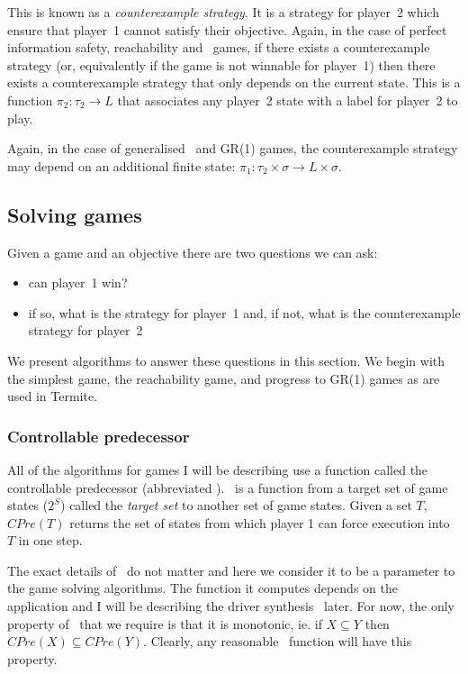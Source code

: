 This is known as a \emph{counterexample strategy}. It is a strategy for player~2 which ensure that player~1 cannot satisfy their objective. Again, in the case of perfect information safety, reachability and \buchi\ games, if there exists a counterexample strategy (or, equivalently if the game is not winnable for player~1) then there exists a counterexample strategy that only depends on the current state. This is a function $\pi_2 : \tau_2 \rightarrow L$ that associates any player~2 state with a label for player~2 to play. 

Again, in the case of generalised \buchi\ and GR(1) games, the counterexample strategy may depend on an additional finite state: $\pi_1 : \tau_2 \times \sigma \rightarrow L \times \sigma$.

\subsection{Solving games}

Given a game and an objective there are two questions we can ask:
\begin{itemize}
    \item can player~1 win?
    \item if so, what is the strategy for player~1 and, if not, what is the counterexample strategy for player~2
\end{itemize}

We present algorithms to answer these questions in this section. We begin with the simplest game, the reachability game, and progress to GR(1) games as are used in Termite.

\subsubsection{Controllable predecessor}

All of the algorithms for games I will be describing use a function called the controllable predecessor (abbreviated \cpre). \cpre\ is a function from a target set of game states ($2^S$) called the \emph{target set} to another set of game states. Given a set $T$, $CPre(T)$ returns the set of states from which player 1 can force execution into $T$ in one step. 

The exact details of \cpre\ do not matter and here we consider it to be a parameter to the game solving algorithms. The function it computes depends on the application and I will be describing the driver synthesis \cpre\ later. For now, the only property of \cpre\ that we require is that it is monotonic, ie. if $X \subseteq Y$ then $CPre(X) \subseteq CPre(Y)$. Clearly, any reasonable \cpre\ function will have this property.

